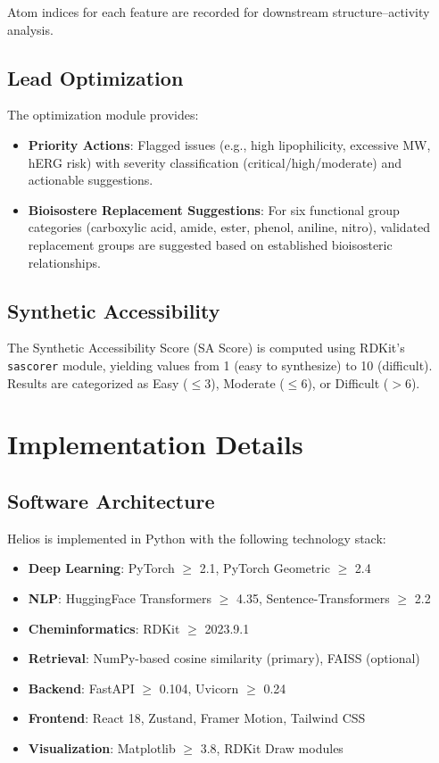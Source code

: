 \documentclass[conference]{IEEEtran}
\begin{document}
Atom indices for each feature are recorded for downstream structure--activity analysis.

\subsection{Lead Optimization}

The optimization module provides:
\begin{itemize}
    \item \textbf{Priority Actions}: Flagged issues (e.g., high lipophilicity, excessive MW, hERG risk) with severity classification (critical/high/moderate) and actionable suggestions.
    \item \textbf{Bioisostere Replacement Suggestions}: For six functional group categories (carboxylic acid, amide, ester, phenol, aniline, nitro), validated replacement groups are suggested based on established bioisosteric relationships.
\end{itemize}

\subsection{Synthetic Accessibility}

The Synthetic Accessibility Score (SA Score) \cite{ertl2009sascore} is computed using RDKit's \texttt{sascorer} module, yielding values from 1 (easy to synthesize) to 10 (difficult). Results are categorized as Easy ($\leq 3$), Moderate ($\leq 6$), or Difficult ($> 6$).

\section{Implementation Details}
\label{sec:implementation}

\subsection{Software Architecture}

Helios is implemented in Python with the following technology stack:

\begin{itemize}
    \item \textbf{Deep Learning}: PyTorch $\geq$ 2.1, PyTorch Geometric $\geq$ 2.4
    \item \textbf{NLP}: HuggingFace Transformers $\geq$ 4.35, Sentence-Transformers $\geq$ 2.2
    \item \textbf{Cheminformatics}: RDKit $\geq$ 2023.9.1
    \item \textbf{Retrieval}: NumPy-based cosine similarity (primary), FAISS (optional)
    \item \textbf{Backend}: FastAPI $\geq$ 0.104, Uvicorn $\geq$ 0.24
    \item \textbf{Frontend}: React 18, Zustand, Framer Motion, Tailwind CSS
    \item \textbf{Visualization}: Matplotlib $\geq$ 3.8, RDKit Draw modules
\end{itemize}
\end{document}
